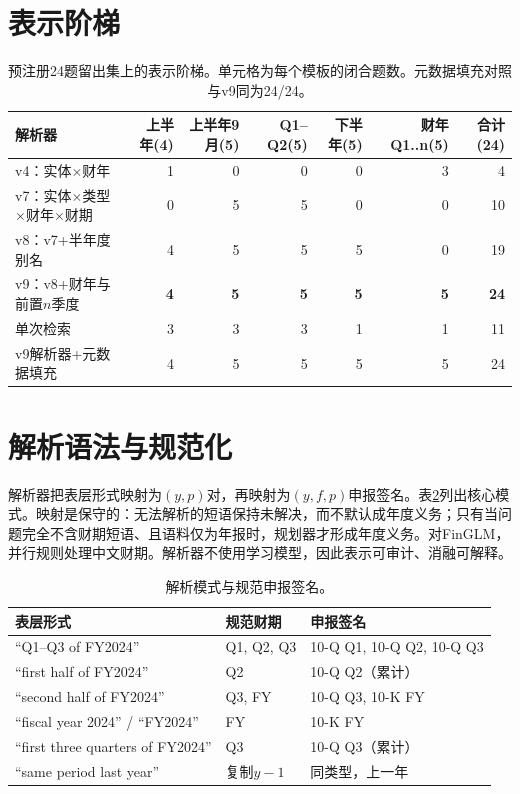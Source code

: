 \documentclass[10.5pt,a4paper]{ctexart}
\begin{document}
\section{表示阶梯}
\label{app:ladder}
\begin{table}[H]\centering\footnotesize
\caption{预注册24题留出集上的表示阶梯。单元格为每个模板的闭合题数。元数据填充对照与v9同为24/24。}
\label{tab:ladder}
\begin{tabular}{lrrrrrr}
\toprule
解析器 & 上半年(4) & 上半年9月(5) & Q1--Q2(5) & 下半年(5) & 财年Q1..n(5) & 合计(24)\\
\midrule
v4：实体$\times$财年 & 1 & 0 & 0 & 0 & 3 & 4\\
v7：实体$\times$类型$\times$财年$\times$财期 & 0 & 5 & 5 & 0 & 0 & 10\\
v8：v7+半年度别名 & 4 & 5 & 5 & 5 & 0 & 19\\
v9：v8+财年与前置$n$季度 & \textbf{4} & \textbf{5} & \textbf{5} & \textbf{5} & \textbf{5} & \textbf{24}\\
单次检索 & 3 & 3 & 3 & 1 & 1 & 11\\
v9解析器+元数据填充 & 4 & 5 & 5 & 5 & 5 & 24\\
\bottomrule
\end{tabular}
\end{table}

\section{解析语法与规范化}
\label{app:parser}
解析器把表层形式映射为$(y,p)$对，再映射为$(y,f,p)$申报签名。表\ref{tab:grammar}列出核心模式。映射是保守的：无法解析的短语保持未解决，而不默认成年度义务；只有当问题完全不含财期短语、且语料仅为年报时，规划器才形成年度义务。对FinGLM，并行规则处理中文财期。解析器不使用学习模型，因此表示可审计、消融可解释。

\begin{table}[H]\centering\small
\caption{解析模式与规范申报签名。}
\label{tab:grammar}
\begin{tabular}{lll}
\toprule
表层形式 & 规范财期 & 申报签名\\
\midrule
“Q1--Q3 of FY2024” & Q1, Q2, Q3 & 10-Q Q1, 10-Q Q2, 10-Q Q3\\
“first half of FY2024” & Q2 & 10-Q Q2（累计）\\
“second half of FY2024” & Q3, FY & 10-Q Q3, 10-K FY\\
“fiscal year 2024” / “FY2024” & FY & 10-K FY\\
“first three quarters of FY2024” & Q3 & 10-Q Q3（累计）\\
“same period last year” & 复制$y-1$ & 同类型，上一年\\
\bottomrule
\end{tabular}
\end{table}
\end{document}
